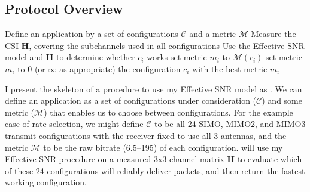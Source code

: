 \subsection{Protocol Overview}
\begin{algorithm}[tp]
\caption{\label{alg:eff_snr_basic}}
\begin{algorithmic}[1]
\STATE Define an application by a set of configurations $\mathcal{C}$ and a metric $\mathcal{M}$
\STATE Measure the CSI $\mathbf{H}$, covering the subchannels used in all configurations
\STATE Use the Effective SNR model and $\mathbf{H}$ to determine whether $c_i$ works 
\STATE set metric $m_i$ to $\mathcal{M}(c_i)$
\ELSE
\STATE set metric $m_i$ to 0 (or $\infty$ as appropriate)
\ENDIF
\ENDFOR
\RETURN the configuration $c_i$ with the best metric $m_i$
\end{algorithmic}
\end{algorithm}
I present the skeleton of a procedure to use my Effective SNR model as . We can define an application as a set of configurations under consideration ($\mathcal{C}$) and some metric ($\mathcal{M}$) that enables us to choose between configurations. For the example case of rate selection, we might define $\mathcal{C}$ to be all 24 SIMO, MIMO2, and MIMO3 transmit configurations with the receiver fixed to use all 3 antennas, and the metric $\mathcal{M}$ to be the raw bitrate (6.5\Mbps--195\Mbps) of each configuration.  will use my Effective SNR procedure on a measured 3x3 channel matrix $\mathbf{H}$ to evaluate which of these 24 configurations will reliably deliver packets, and then return the fastest working configuration.

